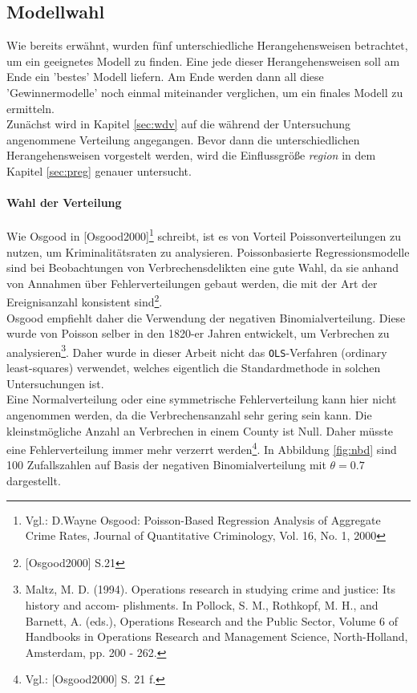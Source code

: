 \subsection{Modellwahl}
Wie bereits erw\"ahnt, wurden f\"unf unterschiedliche Herangehensweisen betrachtet, um ein geeignetes Modell zu finden.
Eine jede dieser Herangehensweisen soll am Ende ein 'bestes' Modell liefern.
Am Ende werden dann all diese 'Gewinnermodelle' noch einmal miteinander verglichen, um ein finales Modell zu ermitteln. \\
Zun\"achst wird in Kapitel \ref{sec:wdv} auf die w\"ahrend der Untersuchung angenommene  Verteilung angegangen. 
Bevor dann die unterschiedlichen Herangehensweisen vorgestelt werden, wird die Einflussgr\"o\ss{}e \textit{region} in dem Kapitel \ref{sec:preg} genauer untersucht.

\paragraph{Wahl der Verteilung}
Wie Osgood in [Osgood2000]\footnote{Vgl.: D.Wayne Osgood: Poisson-Based Regression Analysis of Aggregate
Crime Rates, Journal of Quantitative Criminology, Vol. 16, No. 1, 2000}
schreibt, ist es von Vorteil Poissonverteilungen zu nutzen, um Kriminalit\"atsraten zu analysieren.
Poissonbasierte Regressionsmodelle sind bei Beobachtungen von Verbrechensdelikten eine gute Wahl, da sie anhand von Annahmen \"uber Fehlerverteilungen gebaut werden, die mit der Art der Ereignisanzahl konsistent sind\footnote{[Osgood2000] S.21}. \\
Osgood empfiehlt daher die Verwendung der negativen Binomialverteilung. Diese wurde von Poisson selber in den 1820-er Jahren entwickelt, um Verbrechen zu analysieren\footnote{Maltz, M. D. (1994). Operations research in studying crime and justice: Its history and accom-
plishments. In Pollock, S. M., Rothkopf, M. H., and Barnett, A. (eds.), Operations
Research and the Public Sector, Volume 6 of Handbooks in Operations Research and
Management Science, North-Holland, Amsterdam, pp. 200 - 262.}.
Daher wurde in dieser Arbeit nicht das \texttt{OLS}-Verfahren (ordinary least-squares) verwendet, welches eigentlich die Standardmethode in solchen Untersuchungen ist. \\
Eine Normalverteilung oder eine symmetrische Fehlerverteilung kann hier nicht angenommen werden, da die Verbrechensanzahl sehr gering sein kann.
Die kleinstm\"ogliche Anzahl an Verbrechen in einem County ist Null.
Daher m\"usste eine Fehlerverteilung immer mehr verzerrt werden\footnote{Vgl.: [Osgood2000] S. 21 f.}.
In Abbildung \ref{fig:nbd} sind 100 Zufallszahlen auf Basis der negativen Binomialverteilung mit $\theta = 0.7$ dargestellt.

